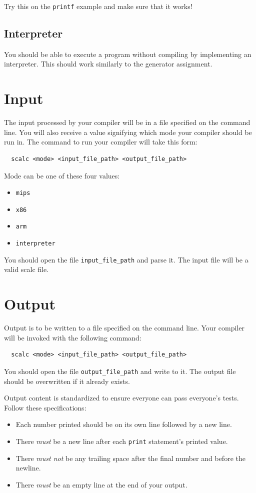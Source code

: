 \documentclass{article}
\newcommand{\code}[1]{\texttt{\textmd{#1}}}
\begin{document}
Try this on the \texttt{printf} example and make sure that it works!

\subsection{Interpreter}
You should be able to execute a program without compiling by implementing an interpreter. This
should work similarly to the generator assignment.

\section{Input}
The input processed by your compiler will be in a file specified on the command line. You will also
receive a value signifying which mode your compiler should be run in. The command to run your
compiler will take this form:
\begin{lstlisting}
  scalc <mode> <input_file_path> <output_file_path>
\end{lstlisting}

Mode can be one of these four values:
\begin{itemize}
  \item \code{mips}
  \item \code{x86}
  \item \code{arm}
  \item \code{interpreter}
\end{itemize}

You should open the file \code{input\_file\_path} and parse it. The input file will be a valid
scalc file.

\section{Output}
Output is to be written to a file specified on the command line. Your compiler will be invoked with
the following command:
\begin{lstlisting}
  scalc <mode> <input_file_path> <output_file_path>
\end{lstlisting}
You should open the file \code{output\_file\_path} and write to it. The output file should be
overwritten if it already exists.

Output content is standardized to ensure everyone can pass everyone's tests. Follow these
specifications:
\begin{itemize}
  \item
    Each number printed should be on its own line followed by a new line.
  \item
    There \textit{must} be a new line after each \code{print} statement's printed value.
  \item
    There \textit{must not} be any trailing space after the final number and before the newline.
  \item
    There \textit{must} be an empty line at the end of your output.
\end{itemize}
\end{document}
